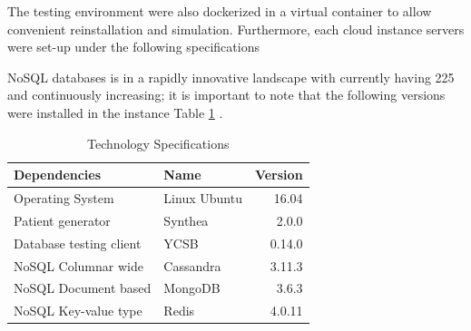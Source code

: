 \documentclass[5p]{elsarticle}
\begin{document}
The testing environment were also dockerized in a virtual container to allow convenient reinstallation and simulation. 
Furthermore, each cloud instance servers were set-up under the following specifications

NoSQL databases is in a rapidly innovative landscape with currently having 225 \cite{S.Edlich2018} and continuously increasing; 
it is important to note that the following versions were installed in the instance Table \ref{table.technology.versions} .
\begin{table}[!hb]
    \centering															
    \caption{Technology Specifications}
     \label{table.technology.versions}
     \begin{tabular}{llr}
        \toprule
        Dependencies & Name & Version\\
        \hline
        Operating System        & Linux Ubuntu & 16.04\\
        Patient generator       & Synthea      & 2.0.0\\
        Database testing client & YCSB         & 0.14.0\\
        NoSQL Columnar wide     & Cassandra    & 3.11.3\\
        NoSQL Document based    & MongoDB      & 3.6.3\\
        NoSQL Key-value type    & Redis        & 4.0.11\\
        \hline
    \end{tabular}															
\end{table}
\end{document}
